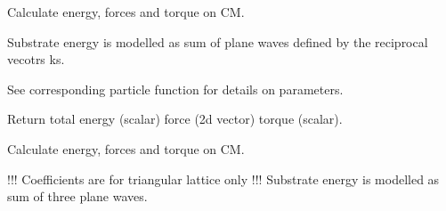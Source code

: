 \documentclass[letterpaper,10pt,english]{sphinxmanual}
\begin{document}
\begin{fulllineitems}
\label{\detokenize{tool_create_substrate:tool_create_substrate.calc_en_sin}}
\pysigstartsignatures
{}
\pysigstopsignatures
\sphinxAtStartPar
Calculate energy, forces and torque on CM.

\sphinxAtStartPar
Substrate energy is modelled as sum of plane waves defined by the reciprocal vecotrs ks.

\sphinxAtStartPar
See corresponding particle function for details on parameters.

\sphinxAtStartPar
Return total energy (scalar) force (2d vector) torque (scalar).

\end{fulllineitems}


\begin{fulllineitems}
\label{\detokenize{tool_create_substrate:tool_create_substrate.calc_en_sin_tri}}
\pysigstartsignatures
{}
\pysigstopsignatures
\sphinxAtStartPar
Calculate energy, forces and torque on CM.

\sphinxAtStartPar
!!! Coefficients are for triangular lattice only !!!
Substrate energy is modelled as sum of three plane waves.

\end{fulllineitems}

\end{document}
